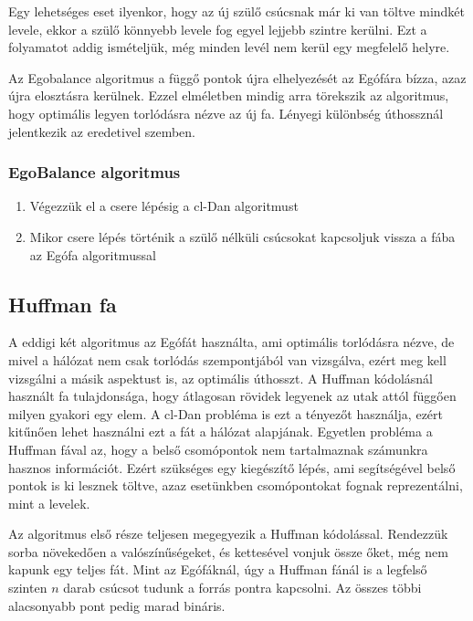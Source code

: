 \documentclass[12pt]{report}
\begin{document}
\pagebreak

Egy lehetséges eset ilyenkor, hogy az új szülő csúcsnak már ki van töltve mindkét levele, ekkor a szülő könnyebb levele fog egyel lejjebb szintre kerülni.
Ezt a folyamatot addig ismételjük, még minden levél nem kerül egy megfelelő helyre.

Az Egobalance algoritmus a függő pontok újra elhelyezését az Egófára bízza, azaz újra elosztásra kerülnek.
Ezzel elméletben mindig arra törekszik az algoritmus, hogy optimális legyen torlódásra nézve az új fa.
Lényegi különbség úthossznál jelentkezik az eredetivel szemben.

\subsubsection{EgoBalance algoritmus}
\begin{enumerate}
	\item Végezzük el a csere lépésig a cl-Dan algoritmust
	\item Mikor csere lépés történik a szülő nélküli csúcsokat kapcsoljuk vissza a fába az Egófa algoritmussal
\end{enumerate}

\subsection{Huffman fa}

A eddigi két algoritmus az Egófát \cite{avin_demand-aware_nodate} használta, ami optimális torlódásra nézve, de mivel a hálózat nem csak torlódás szempontjából van vizsgálva, ezért meg kell vizsgálni a másik aspektust is, az optimális úthosszt.
A Huffman kódolásnál \cite{huf52} használt fa tulajdonsága, hogy átlagosan rövidek legyenek az utak attól függően milyen gyakori egy elem.
A cl-Dan probléma is ezt a tényezőt használja, ezért kitűnően lehet használni ezt a fát a hálózat alapjának.
Egyetlen probléma a Huffman fával az, hogy a belső csomópontok nem tartalmaznak számunkra hasznos információt.
Ezért szükséges egy kiegészítő lépés, ami segítségével belső pontok is ki lesznek töltve, azaz esetünkben csomópontokat fognak reprezentálni, mint a levelek.

Az algoritmus első része teljesen megegyezik a Huffman kódolással.
Rendezzük sorba növekedően a valószínűségeket, és kettesével vonjuk össze őket, még nem kapunk egy teljes fát.
Mint az Egófáknál, úgy a Huffman fánál is a legfelső szinten \(n\) darab csúcsot tudunk a forrás pontra kapcsolni.
Az összes többi alacsonyabb pont pedig marad bináris.
\end{document}
